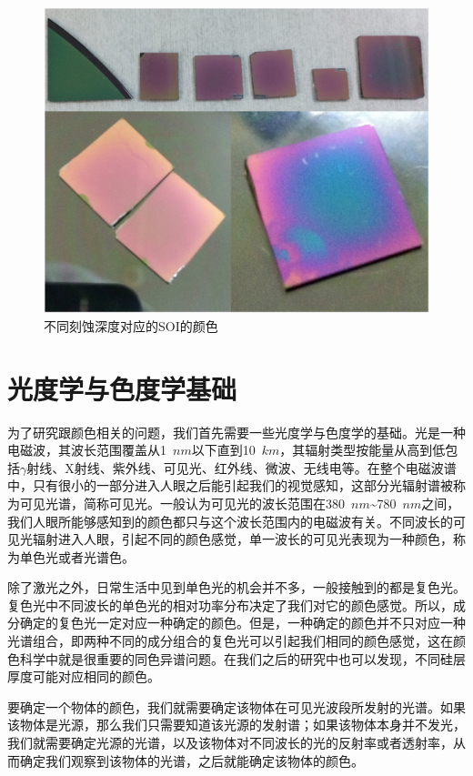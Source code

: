 \begin{figure}[htb]
	\centering
	\includegraphics[width=12cm]{./Pictures/color_etch_time.jpg}
	\captionsetup{justification=centering}
	\caption{不同刻蚀深度对应的SOI的颜色}
	\label{color_etch_time}
\end{figure}

\section{光度学与色度学基础}
为了研究跟颜色相关的问题，我们首先需要一些光度学与色度学的基础。光是一种电磁波，其波长范围覆盖从1~$nm$以下直到10~$km$，其辐射类型按能量从高到低包括$\gamma$射线、X射线、紫外线、可见光、红外线、微波、无线电等。在整个电磁波谱中，只有很小的一部分进入人眼之后能引起我们的视觉感知，这部分光辐射谱被称为可见光谱，简称可见光。一般认为可见光的波长范围在380~$nm$\~{}780~$nm$之间，我们人眼所能够感知到的颜色都只与这个波长范围内的电磁波有关。不同波长的可见光辐射进入人眼，引起不同的颜色感觉，单一波长的可见光表现为一种颜色，称为单色光或者光谱色。

除了激光之外，日常生活中见到单色光的机会并不多，一般接触到的都是复色光。复色光中不同波长的单色光的相对功率分布决定了我们对它的颜色感觉。所以，成分确定的复色光一定对应一种确定的颜色。但是，一种确定的颜色并不只对应一种光谱组合，即两种不同的成分组合的复色光可以引起我们相同的颜色感觉，这在颜色科学中就是很重要的同色异谱问题。在我们之后的研究中也可以发现，不同硅层厚度可能对应相同的颜色。

要确定一个物体的颜色，我们就需要确定该物体在可见光波段所发射的光谱。如果该物体是光源，那么我们只需要知道该光源的发射谱；如果该物体本身并不发光，我们就需要确定光源的光谱，以及该物体对不同波长的光的反射率或者透射率，从而确定我们观察到该物体的光谱，之后就能确定该物体的颜色。

